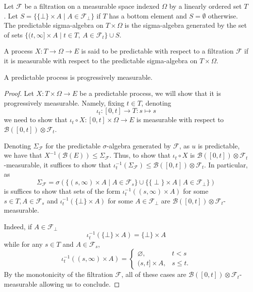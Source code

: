 \begin{definition}\label{def:predictableMeasurableSpace}
  \leanok
Let $\mathcal{F}$ be a filtration on a measurable space indexed $\Omega$ by a linearly ordered set $T$.
Let $S = \{\{\bot\} \times A \mid A \in \mathcal{F}_\bot\}$ if $T$ has a bottom element and $S = \emptyset$ otherwise.
The predictable sigma-algebra on $T \times \Omega$ is the sigma-algebra generated by the set of sets $\{(t, \infty] \times A \mid t \in T, \: A \in \mathcal{F}_t\} \cup S$.
\end{definition}


\begin{definition}\label{def:predictable}
  \leanok
A process $X : T \to \Omega \to E$ is said to be predictable with respect to a filtration $\mathcal{F}$ if it is measurable with respect to the predictable sigma-algebra on $T \times \Omega$.
\end{definition}


\begin{lemma}\label{lem:Predictable.progressive}
  \leanok
A predictable process is progressively measurable.
\end{lemma}

\begin{proof}\leanok
Let $X : T \times \Omega \to E$ be a predictable process, we will show that it is progressively measurable. Namely, fixing $t \in T$, denoting
$$\iota_t : [0, t] \to T : s \mapsto s$$
we need to show that $\iota_t \circ X : [0, t] \times \Omega \to E$ is measurable with respect to $\mathcal{B}([0, t]) \otimes \mathcal{F}_t$.

Denoting $\Sigma_{\mathcal{F}}$ for the predictable $\sigma$-algebra generated by $\mathcal{F}$, as $u$ is predictable, we have that $X^{-1}(\mathcal{B}(E)) \le \Sigma_{\mathcal{F}}$. Thus, to show that $\iota_t \circ X$ is $\mathcal{B}([0, t]) \otimes \mathcal{F}_t$-measurable, it suffices to show that $\iota_t^{-1}(\Sigma_{\mathcal{F}}) \le \mathcal{B}([0, t]) \otimes \mathcal{F}_t$. In particular, as
$$\Sigma_{\mathcal{F}} = \sigma(\{(s, \infty) \times A \mid A \in \mathcal{F}_s\} \cup \{\{\perp\} \times A \mid A \in \mathcal{F}_\perp\})$$
is suffices to show that sets of the form $\iota_t^{-1}((s, \infty) \times A)$ for some $s \in T, A \in \mathcal{F}_s$ and $\iota_t^{-1}(\{\bot\} \times A)$ for some $A \in \mathcal{F}_\bot$ are $\mathcal{B}([0, t]) \otimes \mathcal{F}_t$-measurable.

Indeed, if $A \in \mathcal{F}_\bot$
$$\iota_t^{-1}(\{\bot\} \times A) = \{\bot\} \times A$$
while for any $s \in T$ and $A \in \mathcal{F}_s$,
$$\iota_t^{-1}((s, \infty) \times A) = \begin{cases}
    \varnothing, & t < s\\
    (s, t] \times A, & s \le t.
\end{cases}$$
By the monotonicity of the filtration $\mathcal{F}$, all of these cases are $\mathcal{B}([0, t]) \otimes \mathcal{F}_t$-measurable allowing us to conclude.
\end{proof}

